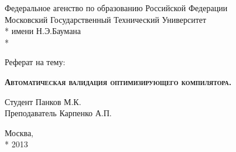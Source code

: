\begin{titlepage}
    \newpage
    
    \begin{center}
        Федеральное агенство по образованию Российской Федерации \\
        Московский Государственный Технический Университет \\*
        имени Н.Э.Баумана \\*
        \vspace{-12mm}
        \begin{figure}[h]
        \end{figure}
        \vspace{-16mm}
        \hrulefill
    \end{center}
    \begin{center}
        \Large Реферат на тему:
    \end{center}
    
    \vspace{2.5em}
    
    \begin{center}
        \textsc{\textbf{Автоматическая валидация оптимизирующего компилятора.}}
    \end{center}
    
    \vspace{6em}
    
    \begin{flushleft}
        \hspace{8.5cm}Студент \hrulefill Панков М.К. \\
        \vspace{1.5em}
        \hspace{8.5cm}Преподаватель \hrulefill Карпенко А.П.\\
    \end{flushleft}
    
    \vspace{\fill}
    
    \begin{center}
        Москва, \\*
        2013
    \end{center}

\end{titlepage}